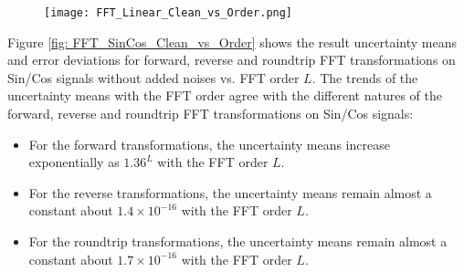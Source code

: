 \documentclass[twoside]{article}
\numberwithin{equation}{section}
\begin{document}
\begin{figure}[p]
\centering
\texttt{[image: FFT\_Linear\_Clean\_vs\_Order.png]} 
\label{fig: FFT_Linear_Clean_vs_Order}
\end{figure}



Figure \ref{fig: FFT_SinCos_Clean_vs_Order} shows the result uncertainty means and error deviations for forward, reverse and roundtrip FFT transformations on Sin/Cos signals without added noises vs. FFT order $L$.
The trends of the uncertainty means with the FFT order agree with the different natures of the forward, reverse and roundtrip FFT transformations on Sin/Cos signals:
\begin{itemize}
\item For the forward transformations, the uncertainty means increase exponentially as $1.36^L$ with the FFT order $L$.

\item For the reverse transformations, the uncertainty means remain almost a constant about $1.4 \times 10^{-16}$ with the FFT order $L$.

\item For the roundtrip transformations, the uncertainty means remain almost a constant about $1.7 \times 10^{-16}$ with the FFT order $L$.

\end{itemize}
\end{document}
